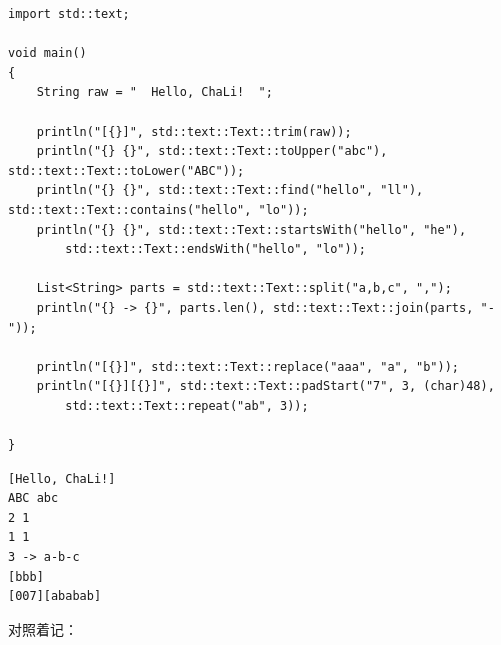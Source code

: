 \par
\medskip
\begin{lstlisting}[style=chali]
import std::text;

void main()
{
    String raw = "  Hello, ChaLi!  ";

    println("[{}]", std::text::Text::trim(raw));
    println("{} {}", std::text::Text::toUpper("abc"), std::text::Text::toLower("ABC"));
    println("{} {}", std::text::Text::find("hello", "ll"), std::text::Text::contains("hello", "lo"));
    println("{} {}", std::text::Text::startsWith("hello", "he"),
        std::text::Text::endsWith("hello", "lo"));

    List<String> parts = std::text::Text::split("a,b,c", ",");
    println("{} -> {}", parts.len(), std::text::Text::join(parts, "-"));

    println("[{}]", std::text::Text::replace("aaa", "a", "b"));
    println("[{}][{}]", std::text::Text::padStart("7", 3, (char)48),
        std::text::Text::repeat("ab", 3));

}
\end{lstlisting}
\par
\medskip

\par
\medskip
\begin{lstlisting}[style=out]
[Hello, ChaLi!]
ABC abc
2 1
1 1
3 -> a-b-c
[bbb]
[007][ababab]
\end{lstlisting}
\par
\medskip

对照着记：

